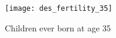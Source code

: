 \documentclass[12pt,letterpaper]{article}
\begin{document}
\clearpage
\newpage



\begin{figure}[htp]%
\centering
\texttt{[image: des\_fertility\_35]}
\caption{Children ever born at age 35}
\label{fig:fertility}
\end{figure}

\clearpage
\newpage
\end{document}
